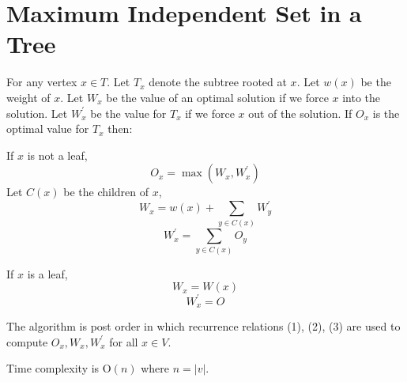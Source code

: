 \documentclass[12pt,twoside,letterpaper]{article}
\begin{document}
\section*{Maximum Independent Set in a Tree}
For any vertex $x \in T$. Let $T_x$ denote the subtree rooted at $x$. Let $w(x)$ be the weight of $x$. Let $W_x$ be the value of an optimal solution if we force $x$ into the solution. Let $W_x^\prime$ be the value for $T_x$ if we force $x$ out of the solution. If $O_x$ is the optimal value for $T_x$ then:

If $x$ is not a leaf,
\begin{equation}
O_x = \max(W_x,W_x^\prime)
\end{equation}
Let $C(x)$ be the children of $x$,
\begin{equation}
W_x = w(x) + \sum_{y \in C(x)} W_y^\prime
\end{equation}
\begin{equation}
W_x^\prime = \sum_{y \in C(x)} O_y
\end{equation}

If $x$ is a leaf,
$$W_x= W(x)$$
$$W_x^\prime = O$$

The algorithm is post order in which recurrence relations (1), (2), (3) are used to compute $O_x, W_x, W_x^\prime$ for all $x \in V$.

Time complexity is $\textrm{O}(n)$ where $n = |v|$.
\end{document}
